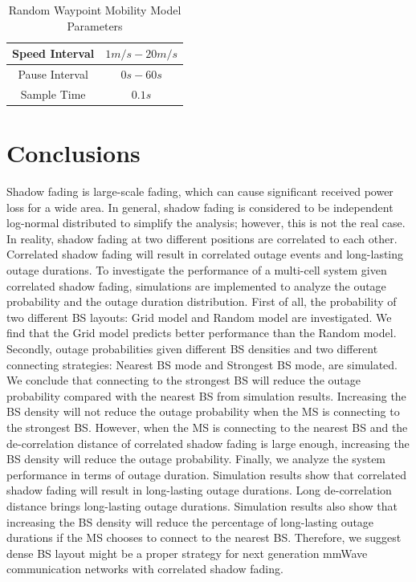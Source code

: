 \documentclass[journal,10pt]{IEEEtran}
\begin{document}
 \begin{table}
 \centering
 \caption{\label{RWP}Random Waypoint Mobility Model Parameters}

 \begin{tabular}{|c|c|}

 \hline
 Speed Interval & $1m/s - 20m/s$\\
 \hline
 Pause Interval & $0s - 60s$\\
 \hline
 Sample Time & $0.1s$\\
 \hline
 \end{tabular}

 \end{table}

 \section{Conclusions}
 \label{Conclusion}
 Shadow fading is large-scale fading, which can cause significant received power loss for a wide area. In general, shadow fading is considered to be independent log-normal distributed to simplify the analysis; however, this is not the real case. In reality, shadow fading at two different positions are correlated to each other. Correlated shadow fading will result in correlated outage events and long-lasting outage durations. To investigate the performance of a multi-cell system given correlated shadow fading, simulations are implemented to analyze the outage probability and the outage duration distribution. First of all, the probability of two different BS layouts: Grid model and Random model are investigated. We find that the Grid model predicts better performance than the Random model. Secondly, outage probabilities given different BS densities and two different connecting strategies: Nearest BS mode and Strongest BS mode, are simulated. We conclude that connecting to the strongest BS will reduce the outage probability compared with the nearest BS from simulation results. Increasing the BS density will not reduce the outage probability when the MS is connecting to the strongest BS. However, when the MS is connecting to the nearest BS and the de-correlation distance of correlated shadow fading is large enough, increasing the BS density will reduce the outage probability.  Finally, we analyze the system performance in terms of outage duration. Simulation results show that correlated shadow fading will result in long-lasting outage durations. Long de-correlation distance brings long-lasting outage durations. Simulation results also show that increasing the BS density will reduce the percentage of long-lasting outage durations if the MS chooses to connect to the nearest BS. Therefore, we suggest dense BS layout might be a proper strategy for next generation mmWave communication networks with correlated shadow fading.
\end{document}
